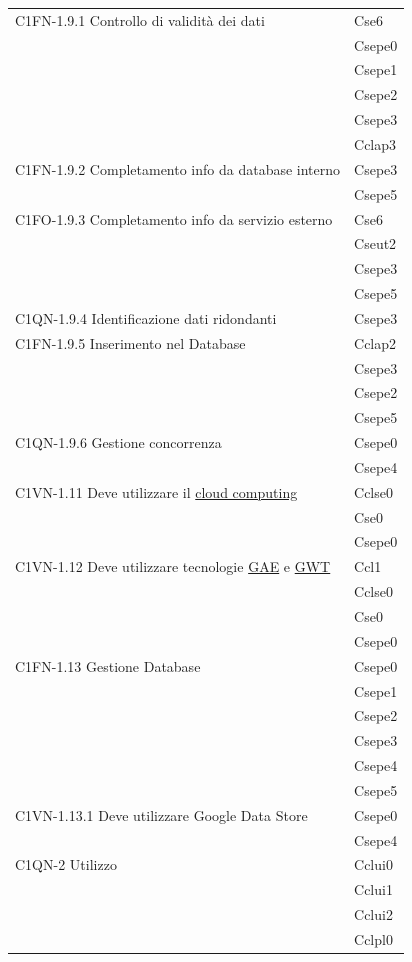 \begin{footnotesize}
\begin{longtable}[!h]{|l|l|}
C1FN-1.9.1 Controllo di validit\`a dei dati & Cse6\\
& Csepe0\\
& Csepe1\\
& Csepe2\\
& Csepe3\\
& Cclap3\\\hline 
C1FN-1.9.2 Completamento info da database interno & Csepe3 \\
& Csepe5 \\\hline   
C1FO-1.9.3 Completamento info da servizio esterno & Cse6\\
& Cseut2\\
& Csepe3\\
& Csepe5\\\hline  
C1QN-1.9.4 Identificazione dati ridondanti & Csepe3\\\hline                                                                                       
C1FN-1.9.5 Inserimento nel Database & Cclap2\\
& Csepe3\\
& Csepe2\\
& Csepe5\\\hline  
C1QN-1.9.6 Gestione concorrenza & Csepe0\\
& Csepe4\\\hline    
C1VN-1.11 Deve utilizzare il \underline{cloud computing} & Cclse0\\
& Cse0\\
& Csepe0\\\hline    
C1VN-1.12 Deve utilizzare tecnologie \underline{GAE} e \underline{GWT} & Ccl1\\
& Cclse0\\
& Cse0\\
& Csepe0\\\hline                                 
C1FN-1.13 Gestione Database & Csepe0\\
& Csepe1\\
& Csepe2\\
& Csepe3\\
& Csepe4\\
& Csepe5\\\hline   
C1VN-1.13.1 Deve utilizzare Google Data Store & Csepe0\\
& Csepe4\\\hline      
C1QN-2 Utilizzo & Cclui0 \\
& Cclui1\\
& Cclui2\\
& Cclpl0\\

\end{longtable}
\end{footnotesize}
